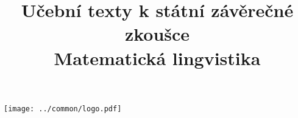 \clearpage

\clearpage

\title{\LARGE Učební texty k státní závěrečné zkoušce \\ Matematická lingvistika}




\maketitle

\vspace{10mm}
\begin{center}
\texttt{[image: ../common/logo.pdf]}
\end{center} 

\clearpage

\clearpage

\tableofcontents







